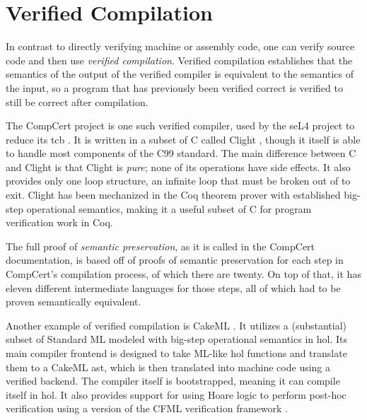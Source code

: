 \section{Verified Compilation}\label{se:verified}
In contrast to directly verifying machine or assembly code,
one can verify source code and then use \emph{verified compilation}.%
Verified compilation establishes that
the semantics of the output of the verified compiler
is equivalent to the semantics of the input,
so a program that has previously been verified correct
is verified to still be correct after compilation.

The CompCert project is one such verified compiler,
used by the seL4 project to reduce its \ac{tcb} \autocite{Klein_AEMSKH_14}.
It is written in a subset of C
called Clight \autocite{leroy:compcert,blazy2009clight},
though it itself is able to handle most components of the C99 standard.
The main difference between C and Clight is that Clight is \emph{pure};
none of its operations have side effects. It also provides only one loop structure,
an infinite loop that must be broken out of to exit.
Clight has been mechanized in the Coq theorem prover with established
big-step operational semantics, making it a useful subset of C
for program verification work in Coq.

The full proof of \emph{semantic preservation},
as it is called in the CompCert documentation,
is based off of proofs of semantic preservation
for each step in CompCert's compilation process, of which there are twenty.
On top of that, it has eleven different intermediate languages for those steps,
all of which had to be proven semantically equivalent.

Another example of verified compilation is CakeML \autocite{kumar2014cakeml}.
It utilizes a (substantial)
subset of Standard ML modeled with big-step operational semantics in \ac{hol}.
Its main compiler frontend is designed to take ML-like \ac{hol} functions
and translate them to a CakeML \ac{ast}, which is then translated into machine code
using a verified backend. The compiler itself is bootstrapped,
meaning it can compile itself in \ac{hol}. It also provides support for using Hoare logic
to perform post-hoc verification using a version of the CFML verification framework
\autocite{gueneau2017formulae,arthur2015union,chargueraud2011cfv}.


